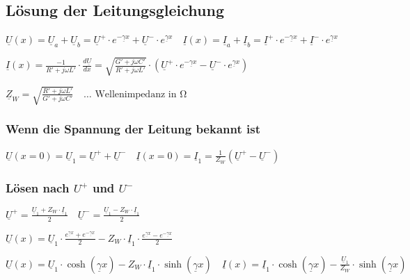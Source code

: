 \subsection{Lösung der Leitungsgleichung}
    $
    \boxed{\underline{U}(x) = \underline{U}_a + \underline{U}_b = \underline{U}^+ \cdot e^{-\underline{\gamma} x} + \underline{U}^- \cdot e^{\underline{\gamma} x}}
    \quad
    \boxed{\underline{I}(x) = \underline{I}_a + \underline{I}_b = \underline{I}^+ \cdot e^{-\underline{\gamma} x} + \underline{I}^- \cdot e^{\underline{\gamma} x}}
    $

    $
    \boxed{\underline{I}(x) = \frac{-1}{R' + j\omega L'} \cdot \frac{d\underline{U}}{dx}
    = \sqrt{\frac{G' + j\omega C'}{R' + j\omega L'}} 
    \cdot \left( \underline{U}^+ \cdot e^{-\underline{\gamma} x} - \underline{U}^- \cdot e^{\underline{\gamma} x} \right)}
    $

    $
    \boxed{\underline{Z}_W = \sqrt{\frac{R' + j\omega L'}{G' + j\omega C'}} \quad \ldots \text{ Wellenimpedanz in } \unit{\ohm}}
    $

\subsubsection{Wenn die Spannung der Leitung bekannt ist}
    $
    \boxed{\underline{U}(x = 0) = \underline{U}_1 = \underline{U}^+ + \underline{U}^-}
    \quad
    \boxed{\underline{I}(x = 0) = \underline{I}_1 = \frac{1}{Z_W} \left( \underline{U}^+ - \underline{U}^- \right)}
    $

\subsubsection{Lösen nach $U^+$ und $U^-$}
    $
    \boxed{\underline{U}^+ = \frac{\underline{U}_1 + Z_W \cdot \underline{I}_1}{2}}
    \quad
    \boxed{\underline{U}^- = \frac{\underline{U}_1 - Z_W \cdot \underline{I}_1}{2}}
    $

    $
    \boxed{\underline{U}(x) = \underline{U}_1 \cdot \frac{e^{\underline{\gamma} x} + e^{-\underline{\gamma} x}}{2} 
    - Z_W \cdot \underline{I}_1 \cdot \frac{e^{\underline{\gamma} x} - e^{-\underline{\gamma} x}}{2}}
    $

    $
    \boxed{\underline{U}(x) = \underline{U}_1 \cdot \cosh(\underline{\gamma} x) 
    - Z_W \cdot \underline{I}_1 \cdot \sinh(\underline{\gamma} x)}
    \quad
    \boxed{\underline{I}(x) = \underline{I}_1 \cdot \cosh(\underline{\gamma} x) 
    - \frac{\underline{U}_1}{Z_W} \cdot \sinh(\underline{\gamma} x)}
    $

